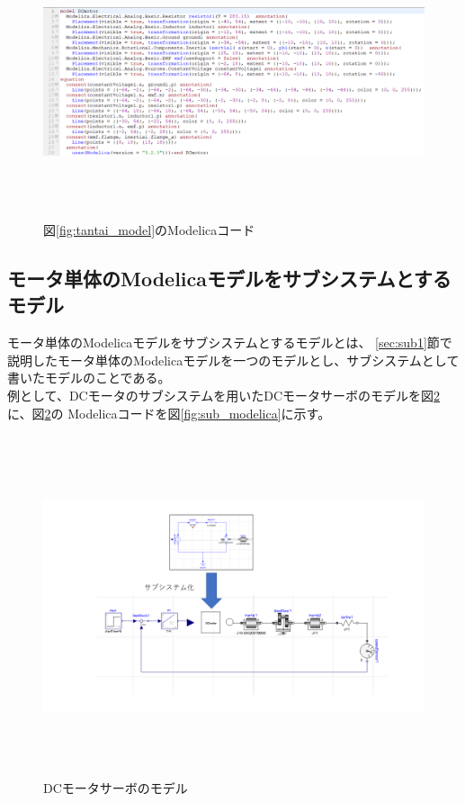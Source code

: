 \begin{figure}[t]
	\centering
	\includegraphics[width=16.5cm,height=8cm]{./Image/tantai_modelica.png}
	\caption{図\ref{fig:tantai_model}のModelicaコード}
	\label{fig:tantai_modelica}
  \end{figure}


\subsection{モータ単体のModelicaモデルをサブシステムとするモデル}\label{sec:sub2}
モータ単体のModelicaモデルをサブシステム\cite{modelicaシステム本}とするモデルとは、
\ref{sec:sub1}節で説明したモータ単体のModelicaモデルを一つのモデルとし、サブシステムとして書いたモデルのことである。\\
例として、DCモータのサブシステムを用いたDCモータサーボのモデルを図\ref{fig:submodel}に、図\ref{fig:submodel}の
Modelicaコードを図\ref{fig:sub_modelica}に示す。

\begin{figure}[t]
	\centering
	\includegraphics[width=16.5cm,height=10cm]{./Image/submodel_pack.png}
	\caption{DCモータサーボのモデル}
	\label{fig:submodel}
  \end{figure}

